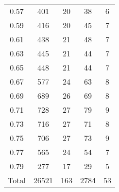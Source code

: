 \begin{table}[h!]
\begin{minipage}{\textwidth}
\begin{center}
\begin{tabular}{c|c|c|c|c}
0.57  & 401  & 20  & 38  & 6\\
0.59  & 416  & 20  & 45  & 7\\
0.61  & 438  & 21  & 48  & 7\\
0.63  & 445  & 21  & 44  & 7\\
0.65  & 448  & 21  & 44  & 7\\
0.67  & 577  & 24  & 63  & 8\\
0.69  & 689  & 26  & 69  & 8\\
0.71  & 728  & 27  & 79  & 9\\
0.73  & 716  & 27  & 71  & 8\\
0.75  & 706  & 27  & 73  & 9\\
0.77  & 565  & 24  & 54  & 7\\
0.79  & 277  & 17  & 29  & 5\\
\hline
Total  & 26521  & 163 & 2784 & 53 \\
\hline \hline
\end{tabular}


\end{center}
\end{minipage}
\end{table}
